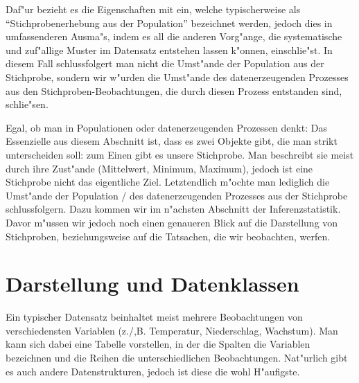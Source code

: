 \documentclass[a4paper,twoside]{tufte-book}\usepackage[]{graphicx}\usepackage[]{color}
\begin{document}
	  Daf"ur bezieht es die Eigenschaften mit ein, welche typischerweise als "`Stichprobenerhebung aus der Population"' bezeichnet werden, jedoch dies in umfassenderen Ausma"s, indem es all die anderen Vorg"ange, die systematische und zuf"allige Muster im Datensatz entstehen lassen k"onnen, einschlie"st. In diesem Fall schlussfolgert man nicht die Umst"ande der Population aus der Stichprobe, sondern wir w"urden die Umst"ande des datenerzeugenden Prozesses aus den Stichproben-Beobachtungen, die durch diesen Prozess entstanden sind, schlie"sen. 
	
	Egal, ob man in Populationen oder datenerzeugenden Prozessen denkt: Das Essenzielle aus diesem Abschnitt ist, dass es zwei Objekte gibt, die man strikt unterscheiden soll: zum Einen gibt es unsere Stichprobe. Man beschreibt sie meist durch ihre Zust"ande (Mittelwert, Minimum, Maximum), jedoch ist eine Stichprobe nicht das eigentliche Ziel. Letztendlich m"ochte man lediglich die Umst"ande der Population / des datenerzeugenden Prozesses aus der Stichprobe schlussfolgern. Dazu kommen wir im n"achsten Abschnitt der Inferenzstatistik. Davor m"ussen wir jedoch noch einen genaueren Blick auf die Darstellung von Stichproben, beziehungsweise auf die Tatsachen, die wir beobachten, werfen.
	
	\section{Darstellung und Datenklassen}
	
	Ein typischer Datensatz beinhaltet meist mehrere Beobachtungen von verschiedensten Variablen (z./,B. Temperatur, Niederschlag, Wachstum). Man kann sich dabei eine Tabelle vorstellen, in der die Spalten die Variablen bezeichnen und die Reihen die unterschiedlichen Beobachtungen. Nat"urlich gibt es auch andere Datenstrukturen, jedoch ist diese die wohl H"aufigste.
	
\end{document}
